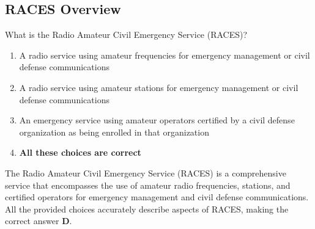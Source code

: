 \subsection{RACES Overview}
\label{T1A10}

\begin{tcolorbox}[colback=gray!10!white,colframe=black!75!black,title=T1A10]
What is the Radio Amateur Civil Emergency Service (RACES)?
\begin{enumerate}[label=\Alph*),noitemsep]
    \item A radio service using amateur frequencies for emergency management or civil defense communications
    \item A radio service using amateur stations for emergency management or civil defense communications
    \item An emergency service using amateur operators certified by a civil defense organization as being enrolled in that organization
    \item \textbf{All these choices are correct}
\end{enumerate}
\end{tcolorbox}

The Radio Amateur Civil Emergency Service (RACES) is a comprehensive service that encompasses the use of amateur radio frequencies, stations, and certified operators for emergency management and civil defense communications. All the provided choices accurately describe aspects of RACES, making the correct answer \textbf{D}.